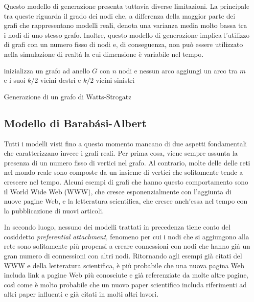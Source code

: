 Questo modello di generazione presenta tuttavia diverse limitazioni. La principale tra queste riguarda il grado dei nodi che, a differenza della maggior parte dei grafi che rappresentano modelli reali, denota una varianza media molto bassa tra i nodi di uno stesso grafo. Inoltre, questo modello di generazione implica l'utilizzo di grafi con un numero fisso di nodi e, di conseguenza, non può essere utilizzato nella simulazione di realtà la cui dimensione è variabile nel tempo.

\begin{algorithm}
\SetAlgoLined
{}
 inizializza un grafo ad anello $G$ con $n$ nodi e nessun arco\;
  {
 	aggiungi un arco tra $m$ e i suoi $k/2$ vicini destri e $k/2$ vicini sinistri\;
 }
 \caption{Generazione di un grafo di Watts-Strogatz}
 \label{alg:wsg}
\end{algorithm}

\subsection{Modello di Barabási-Albert}
\label{subsec:barab}
Tutti i modelli visti fino a questo momento mancano di due aspetti fondamentali che caratterizzano invece i grafi reali. Per prima cosa, viene sempre assunta la presenza di un numero fisso di vertici nel grafo. Al contrario, molte delle delle reti nel mondo reale sono composte da un insieme di vertici che solitamente tende a crescere nel tempo. Alcuni esempi di grafi che hanno questo comportamento sono il World Wide Web (WWW), che cresce esponenzialmente con l'aggiunta di nuove pagine Web, e la letteratura scientifica, che cresce anch'essa nel tempo con la pubblicazione di nuovi articoli. 

In secondo luogo, nessuno dei modelli trattati in precedenza tiene conto del cosiddetto \textit{preferential attachment}, fenomeno per cui i nodi che si aggiungono alla rete sono solitamente più propensi a creare connessioni con nodi che hanno già un gran numero di connessioni con altri nodi. Ritornando agli esempi già citati del WWW e della letteratura scientifica, è più probabile che una nuova pagina Web includa link a pagine Web più conosciute e già referenziate da molte altre pagine, così come è molto probabile che un nuovo paper scientifico includa riferimenti ad altri paper influenti e già citati in molti altri lavori. 

